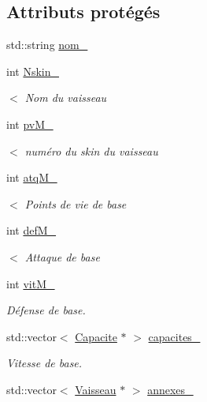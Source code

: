 \subsection*{Attributs protégés}
\begin{DoxyCompactItemize}
\item 
std\+::string \hyperlink{class_vaisseau_a2abb8ab70479bc486d19b563dddbe825}{nom\+\_\+}
\item 
int \hyperlink{class_vaisseau_af6b149a2f49de284503d5e3f80e2735a}{Nskin\+\_\+}
\begin{DoxyCompactList}\small\item\em $<$ Nom du vaisseau \end{DoxyCompactList}\item 
int \hyperlink{class_vaisseau_ac8b21f62b8c41f90864b1bca81d685de}{pv\+M\+\_\+}
\begin{DoxyCompactList}\small\item\em $<$ numéro du skin du vaisseau \end{DoxyCompactList}\item 
int \hyperlink{class_vaisseau_a24d3d623d4f470aa1a11222c3872b2ec}{atq\+M\+\_\+}
\begin{DoxyCompactList}\small\item\em $<$ Points de vie de base \end{DoxyCompactList}\item 
int \hyperlink{class_vaisseau_ad62e88bb7527f72a6a446d9bbb219744}{def\+M\+\_\+}
\begin{DoxyCompactList}\small\item\em $<$ Attaque de base \end{DoxyCompactList}\item 
int \hyperlink{class_vaisseau_a7cf3915f4d4044ee28fd5e5633fce11c}{vit\+M\+\_\+}
\begin{DoxyCompactList}\small\item\em Défense de base. \end{DoxyCompactList}\item 
std\+::vector$<$ \hyperlink{class_capacite}{Capacite} $\ast$ $>$ \hyperlink{class_vaisseau_a5db47e079dc15db1158bd0a549f22908}{capacites\+\_\+}
\begin{DoxyCompactList}\small\item\em Vitesse de base. \end{DoxyCompactList}\item 
std\+::vector$<$ \hyperlink{class_vaisseau}{Vaisseau} $\ast$ $>$ \hyperlink{class_vaisseau_a077c826bea6ce9f63de811762fbe8784}{annexes\+\_\+}

\end{DoxyCompactItemize}
